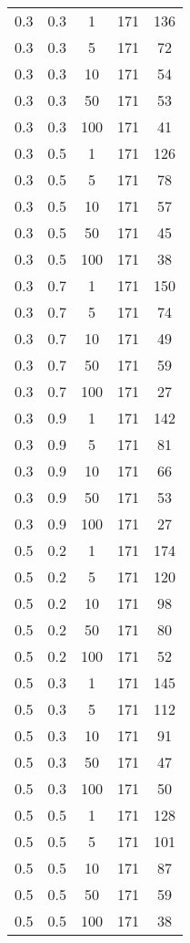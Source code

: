 \begin{appendices}
\begin{longtable}{|c|c|c|c|c|}
		0.3 & 0.3 & 1   & 171 & 136 \\
		0.3 & 0.3 & 5   & 171 & 72  \\
		0.3 & 0.3 & 10  & 171 & 54  \\
		0.3 & 0.3 & 50  & 171 & 53  \\
		0.3 & 0.3 & 100 & 171 & 41  \\ \hline
		0.3 & 0.5 & 1   & 171 & 126 \\
		0.3 & 0.5 & 5   & 171 & 78  \\
		0.3 & 0.5 & 10  & 171 & 57  \\
		0.3 & 0.5 & 50  & 171 & 45  \\
		0.3 & 0.5 & 100 & 171 & 38  \\ \hline
		0.3 & 0.7 & 1   & 171 & 150 \\
		0.3 & 0.7 & 5   & 171 & 74  \\
		0.3 & 0.7 & 10  & 171 & 49  \\
		0.3 & 0.7 & 50  & 171 & 59  \\
		0.3 & 0.7 & 100 & 171 & 27  \\ \hline
		0.3 & 0.9 & 1   & 171 & 142 \\
		0.3 & 0.9 & 5   & 171 & 81  \\
		0.3 & 0.9 & 10  & 171 & 66  \\
		0.3 & 0.9 & 50  & 171 & 53  \\
		0.3 & 0.9 & 100 & 171 & 27  \\ \hline
		0.5 & 0.2 & 1   & 171 & 174 \\
		0.5 & 0.2 & 5   & 171 & 120 \\
		0.5 & 0.2 & 10  & 171 & 98  \\
		0.5 & 0.2 & 50  & 171 & 80  \\
		0.5 & 0.2 & 100 & 171 & 52  \\ \hline
		0.5 & 0.3 & 1   & 171 & 145 \\
		0.5 & 0.3 & 5   & 171 & 112 \\
		0.5 & 0.3 & 10  & 171 & 91  \\
		0.5 & 0.3 & 50  & 171 & 47  \\
		0.5 & 0.3 & 100 & 171 & 50  \\ \hline
		0.5 & 0.5 & 1   & 171 & 128 \\
		0.5 & 0.5 & 5   & 171 & 101 \\
		0.5 & 0.5 & 10  & 171 & 87  \\
		0.5 & 0.5 & 50  & 171 & 59  \\
		0.5 & 0.5 & 100 & 171 & 38  \\ \hline

\end{longtable}
\end{appendices}
